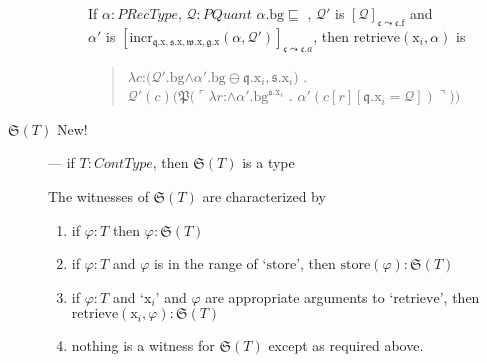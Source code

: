 \begin{description}
\begin{description}
    If $\alpha:\textit{PRecType}$, $\mathcal{Q}:\textit{PQuant}$ 
  $\alpha.\text{bg}\sqsubseteq$ , $\mathcal{Q}'$ is
$[\mathcal{Q}]_{\mathfrak{c}\leadsto\mathfrak{c}.\text{f}}$ and\\
$\alpha'$ is
$[\mathrm{incr}_{\mathfrak{q}.\text{x},\mathfrak{s}.\text{x},\mathfrak{w}.\text{x},\mathfrak{g}.\text{x}}(\alpha,\mathcal{Q}')]_{\mathfrak{c}\leadsto\mathfrak{c}.a}$, then
  $\mathrm{retrieve}(\text{x}_i,\alpha)$ is
  \begin{quote}
    $\lambda
    c$:$(\mathcal{Q}'.\text{bg}$\d{$\wedge$}$\alpha'.\text{bg}\ominus\mathfrak{q}.\text{x}_i,\mathfrak{s}.\text{x}_i)$
    . \\ \hspace*{2em}$\mathcal{Q'}(c)(\mathfrak{P}(\ulcorner\lambda
    r$:\d{$\wedge$}$\alpha'.\text{bg}^{\mathfrak{s}.\text{x}_i}$
    . $\alpha'(c[r][\mathfrak{q}.\text{x}_i=\mathcal{Q}])\urcorner))$
  \end{quote}



\end{description}

\item[\textnormal{$\mathfrak{S}(T)$} New!] --- if
  $T:\textit{ContType}$, then $\mathfrak{S}(T)$ is a type

  The witnesses of $\mathfrak{S}(T)$ are characterized by
  \begin{enumerate} 
 
  \item if $\varphi:T$ then $\varphi:\mathfrak{S}(T)$ 
 
  \item if $\varphi:T$ and $\varphi$ is in the range of `$\mathrm{store}$', then
    $\mathrm{store}(\varphi):\mathfrak{S}(T)$

  \item if $\varphi:T$ and `x$_i$' and $\varphi$ are appropriate
    arguments to `$\mathrm{retrieve}$', then
    $\mathrm{retrieve}(\text{x}_i,\varphi):\mathfrak{S}(T)$
    
  \item nothing is a witness for $\mathfrak{S}(T)$ except as required above.
 

\end{enumerate}
\end{description}
